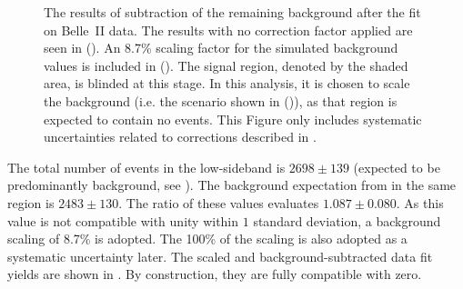 \begin{figure}[hbtp!]
    \centering
    \caption{\label{fig:sidebands_subtracted_figures} The results of subtraction of the remaining \BB background after the fit on Belle~II data.
    The results with no correction factor applied are seen in (). 
    An 8.7\% scaling factor for the simulated background values is included in ().
    The signal region, denoted by the shaded area, is blinded at this stage.
    In this analysis, it is chosen to scale the background (i.e. the scenario shown in ()),
    as that region is expected to contain no \BtoXsgamma events.
    This Figure only includes systematic uncertainties related to corrections described in .
    }
\end{figure}

The total number of events in the low-\EB sideband is $2698\pm139$ (expected to be predominantly background, see ).
The background expectation from \MC in the same region is $2483\pm130$.
The ratio of these values evaluates $1.087\pm0.080$.
As this value is not compatible with unity within $1$ standard deviation, a background scaling of 8.7\% is adopted.
The 100\% of the scaling is also adopted as a systematic uncertainty later.
The scaled and background-subtracted data fit yields are shown in .
By construction, they are fully compatible with zero.

